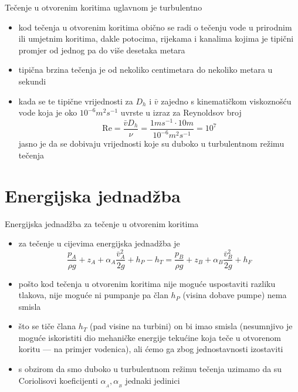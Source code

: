 \documentclass[croatian]{beamer}
\begin{document}
\begin{frame}{Tečenje u otvorenim koritima uglavnom je turbulentno}

\begin{itemize}
\item kod tečenja u otvorenim koritima obično se radi o tečenju vode u prirodnim
ili umjetnim koritima, dakle potocima, rijekama i kanalima kojima
je tipični promjer od jednog pa do više desetaka metara
\item tipična brzina tečenja je od nekoliko centimetara do nekoliko metara
u sekundi
\item kada se te tipične vrijednosti za $D_{h}$ i $\bar{v}$ zajedno s
kinematičkom viskoznošću vode koja je oko $10^{-6}m^{2}s^{-1}$ uvrste
u izraz za Reynoldsov broj
\[
\mathrm{Re}=\frac{\bar{v}D_{h}}{\nu}=\frac{1ms^{-1}\cdot10m}{10^{-6}m^{2}s^{-1}}=10^{7}
\]
jasno je da se dobivaju vrijednosti koje su duboko u turbulentnom
režimu tečenja
\end{itemize}
\end{frame}

\section{Energijska jednadžba}
\begin{frame}{Energijska jednadžba za tečenje u otvorenim koritima}

\begin{itemize}
\item za tečenje u cijevima energijska jednadžba je
\[
\frac{p_{{\scriptscriptstyle A}}}{\rho g}+z_{{\scriptscriptstyle A}}+\alpha_{{\scriptscriptstyle A}}\frac{\bar{v}_{{\scriptscriptstyle A}}^{2}}{2g}+h_{P}-h_{T}=\frac{p_{{\scriptscriptstyle B}}}{\rho g}+z_{{\scriptscriptstyle B}}+\alpha_{{\scriptscriptstyle B}}\frac{\bar{v}_{{\scriptscriptstyle B}}^{2}}{2g}+h_{F}
\]
\item pošto kod tečenja u otvorenim koritima nije moguće uspostaviti razliku
tlakova, nije moguće ni pumpanje pa član $h_{P}$ (visina dobave pumpe)
nema smisla
\item što se tiče člana $h_{T}$ (pad visine na turbini) on bi imao smisla
(nesumnjivo je moguće iskoristiti dio mehaničke energije tekućine
koja teče u otvorenom koritu --- na primjer vodenica), ali ćemo ga
zbog jednostavnosti izostaviti
\item s obzirom da smo duboko u turbulentnom režimu tečenja uzimamo da su
Coriolisovi koeficijenti $\alpha_{_{A}},\alpha_{_{B}}$ jednaki jedinici 
\end{itemize}
\end{frame}
\end{document}
